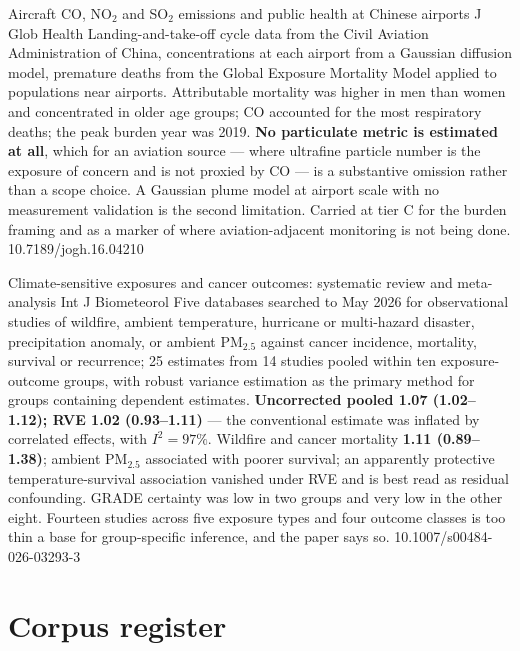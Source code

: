 \documentclass[10pt]{article}
\begin{document}

{Aircraft CO, NO$_2$ and SO$_2$ emissions and public health at Chinese airports}
{J Glob Health}
{Landing-and-take-off cycle data from the Civil Aviation Administration of China,
concentrations at each airport from a Gaussian diffusion model, premature deaths from the
Global Exposure Mortality Model applied to populations near airports. Attributable
mortality was higher in men than women and concentrated in older age groups; CO accounted
for the most respiratory deaths; the peak burden year was 2019. \textbf{No particulate
metric is estimated at all}, which for an aviation source --- where ultrafine particle
number is the exposure of concern and is not proxied by CO --- is a substantive omission
rather than a scope choice. A Gaussian plume model at airport scale with no measurement
validation is the second limitation. Carried at tier C for the burden framing and as a
marker of where aviation-adjacent monitoring is not being done.}
{10.7189/jogh.16.04210}


{Climate-sensitive exposures and cancer outcomes: systematic review and meta-analysis}
{Int J Biometeorol}
{Five databases searched to May 2026 for observational studies of wildfire, ambient
temperature, hurricane or multi-hazard disaster, precipitation anomaly, or ambient
PM$_{2.5}$ against cancer incidence, mortality, survival or recurrence; 25 estimates from
14 studies pooled within ten exposure-outcome groups, with robust variance estimation as
the primary method for groups containing dependent estimates. \textbf{Uncorrected pooled
1.07 (1.02--1.12); RVE 1.02 (0.93--1.11)} --- the conventional estimate was inflated by
correlated effects, with $I^2 = 97\%$. Wildfire and cancer mortality \textbf{1.11
(0.89--1.38)}; ambient PM$_{2.5}$ associated with poorer survival; an apparently
protective temperature-survival association vanished under RVE and is best read as
residual confounding. GRADE certainty was low in two groups and very low in the other
eight. Fourteen studies across five exposure types and four outcome classes is too thin a
base for group-specific inference, and the paper says so.}
{10.1007/s00484-026-03293-3}

\clearpage

\section*{\sffamily\bfseries\color{Deep}Corpus register}
\vspace{-1.5mm}{\color{Amber}\rule{\linewidth}{1.1pt}}\vspace{2.5mm}
\end{document}
